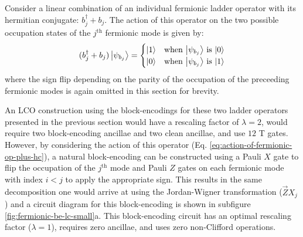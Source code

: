 Consider a linear combination of an individual fermionic ladder operator with its hermitian conjugate: $b_j^\dagger + b_j$.
The action of this operator on the two possible occupation states of the $j^\text{th}$ fermionic mode is given by:
\begin{equation}
    \label{eq:action-of-fermionic-op-plus-hc}
    \begin{split}
        (b_j^\dagger + b_j) \ket{\psi_{b_j}} = \begin{cases} 
            \ket{1} & \text{when $\ket{\psi_{b_j}}$ is $\ket{0}$} \\
            \ket{0} & \text{when $\ket{\psi_{b_j}}$ is $\ket{1}$} \\
                                        \end{cases}
    \end{split}
\end{equation}
where the sign flip depending on the parity of the occupation of the preceeding fermionic modes is again omitted in this section for brevity.

An LCO construction using the block-encodings for these two ladder operators presented in the previous section would have a rescaling factor of $\lambda = 2$, would require two block-encoding ancillae and two clean ancillae, and use $12$ T gates.
However, by considering the action of this operator (Eq. \ref{eq:action-of-fermionic-op-plus-hc}), a natural block-encoding can be constructed using a Pauli $X$ gate to flip the occupation of the $j^\text{th}$ mode and Pauli $Z$ gates on each fermionic mode with index $i < j$ to apply the appropriate sign.
This results in the same decomposition one would arrive at using the Jordan-Wigner transformation ($\vec{Z}X_j$) and a circuit diagram for this block-encoding is shown in subfigure \ref{fig:fermionic-be-lc-small}a.
This block-encoding circuit has an optimal rescaling factor ($\lambda = 1$), requires zero ancillae, and uses zero non-Clifford operations.

